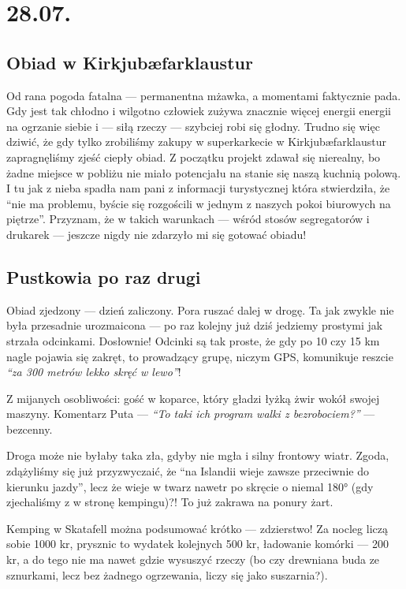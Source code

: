 \chapter*{28.07.}

\section*{Obiad w Kirkjubæfarklaustur}

Od rana pogoda fatalna --- permanentna mżawka, a momentami faktycznie pada. Gdy jest tak chłodno i wilgotno człowiek zużywa znacznie więcej energii energii na ogrzanie siebie i --- siłą rzeczy --- szybciej robi się głodny. Trudno się więc dziwić, że gdy tylko zrobiliśmy zakupy w superkarkecie w Kirkjubæfarklaustur zapragnęliśmy zjeść ciepły obiad. Z początku projekt zdawał się nierealny, bo żadne miejsce w pobliżu nie miało potencjału na stanie się naszą kuchnią polową. I tu jak z nieba spadła nam pani z informacji turystycznej która stwierdziła, że “nie ma problemu, byście się rozgościli w jednym z naszych pokoi biurowych na piętrze”. Przyznam, że w takich warunkach --- wśród stosów segregatorów i drukarek --- jeszcze nigdy nie zdarzyło mi się gotować obiadu!


\section*{Pustkowia po raz drugi}

Obiad zjedzony --- dzień zaliczony. Pora ruszać dalej w drogę. Ta jak zwykle nie była przesadnie urozmaicona --- po raz kolejny już dziś jedziemy prostymi jak strzała odcinkami. Dosłownie! Odcinki są tak proste, że gdy po 10 czy 15 km nagle pojawia się zakręt, to prowadzący grupę, niczym GPS, komunikuje reszcie \emph{“za 300 metrów lekko skręć w lewo”}!

Z mijanych osobliwości: gość w koparce, który gładzi łyżką żwir wokół swojej maszyny. Komentarz Puta --- \emph{“To taki ich program walki z bezrobociem?”} --- bezcenny.


Droga może nie byłaby taka zła, gdyby nie mgła i silny frontowy wiatr. Zgoda, zdążyliśmy się już przyzwyczaić, że “na Islandii wieje zawsze przeciwnie do kierunku jazdy”, lecz że wieje w twarz nawetr po skręcie o niemal 180° (gdy zjechaliśmy z  w stronę kempingu)?! To już zakrawa na ponury żart.


Kemping w Skatafell można podsumować krótko --- zdzierstwo! Za nocleg liczą sobie 1000 kr, prysznic to wydatek kolejnych 500 kr, ładowanie komórki --- 200 kr, a do tego nie ma nawet gdzie wysuszyć rzeczy (bo czy drewniana buda ze sznurkami, lecz bez żadnego ogrzewania, liczy się jako suszarnia?).
